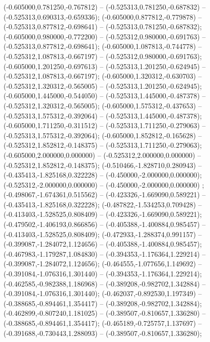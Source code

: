  (-0.605000,0.781250,-0.767812) -- (-0.525313,0.781250,-0.687832) -- (-0.525313,0.690313,-0.659336);
 (-0.605000,0.877812,-0.779878) -- (-0.525313,0.877812,-0.698641) -- (-0.525313,0.781250,-0.687832);
 (-0.605000,0.980000,-0.772200) -- (-0.525312,0.980000,-0.691763) -- (-0.525313,0.877812,-0.698641);
 (-0.605000,1.087813,-0.744778) -- (-0.525312,1.087813,-0.667197) -- (-0.525312,0.980000,-0.691763);
 (-0.605000,1.201250,-0.697613) -- (-0.525313,1.201250,-0.624945) -- (-0.525312,1.087813,-0.667197);
 (-0.605000,1.320312,-0.630703) -- (-0.525312,1.320312,-0.565005) -- (-0.525313,1.201250,-0.624945);
 (-0.605000,1.445000,-0.544050) -- (-0.525313,1.445000,-0.487378) -- (-0.525312,1.320312,-0.565005);
 (-0.605000,1.575312,-0.437653) -- (-0.525313,1.575312,-0.392064) -- (-0.525313,1.445000,-0.487378);
 (-0.605000,1.711250,-0.311512) -- (-0.525313,1.711250,-0.279063) -- (-0.525313,1.575312,-0.392064);
 (-0.605000,1.852812,-0.165628) -- (-0.525312,1.852812,-0.148375) -- (-0.525313,1.711250,-0.279063);
 (-0.605000,2.000000,0.000000) -- (-0.525312,2.000000,0.000000) -- (-0.525312,1.852812,-0.148375);
 (-0.510466,-1.828710,0.280943) -- (-0.435413,-1.825168,0.322228) -- (-0.450000,-2.000000,0.000000);
 (-0.525312,-2.000000,0.000000) -- (-0.450000,-2.000000,0.000000) ;
 (-0.498067,-1.674361,0.515562) -- (-0.423326,-1.669090,0.589221) -- (-0.435413,-1.825168,0.322228);
 (-0.487822,-1.534253,0.709428) -- (-0.413403,-1.528525,0.808409) -- (-0.423326,-1.669090,0.589221);
 (-0.479502,-1.406193,0.866856) -- (-0.405388,-1.400884,0.985457) -- (-0.413403,-1.528525,0.808409);
 (-0.472933,-1.288374,0.991157) -- (-0.399087,-1.284072,1.124656) -- (-0.405388,-1.400884,0.985457);
 (-0.467983,-1.179287,1.084830) -- (-0.394353,-1.176364,1.229214) -- (-0.399087,-1.284072,1.124656);
 (-0.464555,-1.077656,1.149692) -- (-0.391084,-1.076316,1.301440) -- (-0.394353,-1.176364,1.229214);
 (-0.462585,-0.982388,1.186968) -- (-0.389208,-0.982702,1.342884) -- (-0.391084,-1.076316,1.301440);
 (-0.462037,-0.892530,1.197349) -- (-0.388685,-0.894461,1.354417) -- (-0.389208,-0.982702,1.342884);
 (-0.462899,-0.807240,1.181025) -- (-0.389507,-0.810657,1.336280) -- (-0.388685,-0.894461,1.354417);
 (-0.465189,-0.725757,1.137697) -- (-0.391688,-0.730443,1.288093) -- (-0.389507,-0.810657,1.336280);
